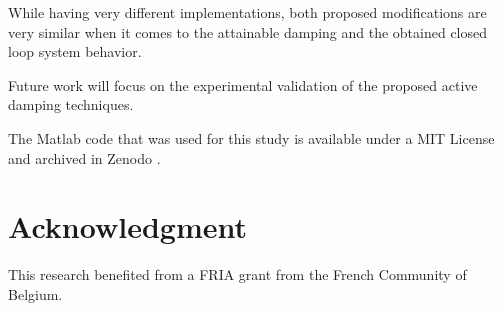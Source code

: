 \documentclass[Afour,sagev,times]{sagej}
\begin{document}
While having very different implementations, both proposed modifications are very similar when it comes to the attainable damping and the obtained closed loop system behavior.

Future work will focus on the experimental validation of the proposed active damping techniques.

The Matlab code that was used for this study is available under a MIT License and archived in Zenodo \cite{dehaeze20_activ_dampin_rotat_posit_platf}.

\section*{Acknowledgment}
\label{sec:org7856ac4}
This research benefited from a FRIA grant from the French Community of Belgium.


\end{document}
